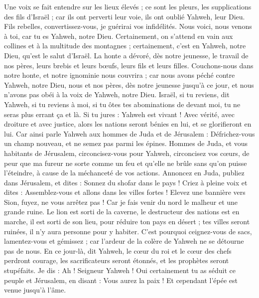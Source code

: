 \begin{multicols}{2}
Une voix se fait entendre sur les lieux élevés ; ce sont les pleurs, les supplications des fils d'Israël ; car ils ont perverti leur voie, ils ont oublié Yahweh, leur Dieu.
Fils rebelles, convertissez-vous, je guérirai vos infidélités. Nous voici, nous venons à toi, car tu es Yahweh, notre Dieu.
Certainement, on s'attend en vain aux collines et à la multitude des montagnes ; certainement, c'est en Yahweh, notre Dieu, qu'est le salut d'Israël.
La honte a dévoré, dès notre jeunesse, le travail de nos pères, leurs brebis et leurs bœufs, leurs fils et leurs filles.
Couchons-nous dans notre honte, et notre ignominie nous couvrira ; car nous avons péché contre Yahweh, notre Dieu, nous et nos pères, dès notre jeunesse jusqu’à ce jour, et nous n'avons pas obéi à la voix de Yahweh, notre Dieu.
\VerseOne{}Israël, si tu reviens, dit Yahweh,  si tu reviens à moi, si tu ôtes tes abominations de devant moi, tu ne seras plus errant ça et là.
Si tu jures : Yahweh est vivant ! Avec vérité, avec droiture et avec justice, alors les nations seront bénies en lui, et se glorifieront en lui.
Car ainsi parle Yahweh aux hommes de Juda et de Jérusalem : Défrichez-vous un champ nouveau, et ne semez pas parmi les épines.
Hommes de Juda, et vous habitants de Jérusalem, circoncisez-vous pour Yahweh, circoncisez vos cœurs, de peur que ma fureur ne sorte comme un feu et qu'elle ne brûle sans qu'on puisse l’éteindre, à cause de la méchanceté de vos actions.
Annoncez en Juda, publiez dans Jérusalem, et dites : Sonnez du shofar dans le pays ! Criez à pleine voix et dites : Assemblez-vous et allons dans les villes fortes !
Elevez une bannière vers Sion, fuyez, ne vous arrêtez pas ! Car je fais venir du nord le malheur et une grande ruine.
Le lion est sorti de la caverne, le destructeur des nations est en marche, il est sorti de son lieu, pour réduire ton pays en désert ; tes villes seront ruinées, il n'y aura personne pour y habiter.
C'est pourquoi ceignez-vous de sacs, lamentez-vous et gémissez ; car l'ardeur de la colère de Yahweh ne se détourne pas de nous.
En ce jour-là, dit Yahweh, le cœur du roi et le cœur des chefs perdront courage, les sacrificateurs seront étonnés, et les prophètes seront stupéfaits.
Je dis : Ah ! Seigneur Yahweh ! Oui certainement tu as séduit ce peuple et Jérusalem, en disant : Vous aurez la paix ! Et cependant l'épée est venue jusqu’à l'âme.

\end{multicols}
